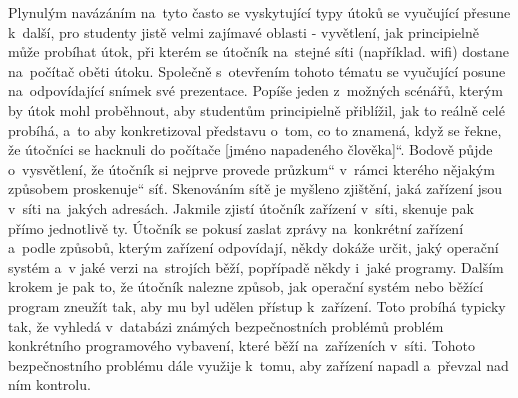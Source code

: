 \documentclass[a4paper, 12pt]{article}
\providecommand{\uv}[1]{\quotedblbase #1\textquotedblleft}
\begin{document}
Plynulým navázáním na~tyto často se vyskytující typy útoků se vyučující přesune k~další, pro studenty jistě velmi zajímavé oblasti - vyvětlení, jak principielně může probíhat útok, při kterém se útočník na~stejné síti (například. wifi) dostane na~počítač oběti útoku. Společně s~otevřením tohoto tématu se vyučující posune na~odpovídající snímek své prezentace. Popíše jeden z~možných scénářů, kterým by útok mohl proběhnout, aby studentům principielně přiblížil, jak to reálně celé probíhá, a~to aby konkretizoval představu o~tom, co to znamená, když se řekne, že \uv{útočníci se hacknuli do počítače [jméno napadeného člověka]}. Bodově půjde o~vysvětlení, že útočník si nejprve provede \uv{průzkum} v~rámci kterého nějakým způsobem \uv{proskenuje} síť. Skenováním sítě je myšleno zjištění, jaká zařízení jsou v~síti na~jakých adresách. Jakmile zjistí útočník zařízení v~síti, skenuje pak přímo jednotlivě ty. Útočník se pokusí zaslat zprávy na~konkrétní zařízení a~podle způsobů, kterým zařízení odpovídají, někdy dokáže určit, jaký operační systém a~v jaké verzi na~strojích běží, popřípadě někdy i~jaké programy. Dalším krokem je pak to, že útočník nalezne způsob, jak operační systém nebo běžící program zneužít tak, aby mu byl udělen přístup k~zařízení. Toto probíhá typicky tak, že vyhledá v~databázi známých bezpečnostních problémů problém konkrétního programového vybavení, které běží na~zařízeních v~síti. Tohoto bezpečnostního problému dále využije k~tomu, aby zařízení napadl a~převzal nad ním kontrolu.
\end{document}
